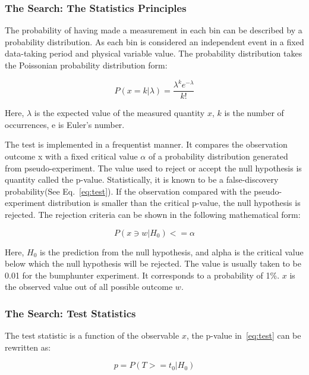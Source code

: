 \subsubsection{The Search: The Statistics Principles}
The probability of having made a measurement in each bin can be described by a probability distribution. As each bin is considered an independent event in a fixed data-taking period and physical variable value. The probability distribution takes the Poissonian probability distribution form:

\begin{equation}
 P(x=k|\lambda) = \frac{\lambda^{k}e^{-\lambda}}{k!} 
 \label{eq:Poissonian}
\end{equation}

Here, $\lambda$ is the expected value of the measured quantity $x$, $k$ is the number of occurrences, e is Euler's number.

The test is implemented in a frequentist manner. It compares the observation outcome x with a fixed critical value $\alpha$ of a probability distribution generated from pseudo-experiment. The value used to reject or accept the null hypothesis is quantity called the p-value. Statistically, it is known to be a false-discovery probability(See Eq.~\ref{eq:test}). If the observation compared with the pseudo-experiment distribution is smaller than the critical p-value, the null hypothesis is rejected. The rejection criteria can be shown in the following mathematical form:

\begin{equation}
    P(x \ni w|H_0)<= \alpha 
    \label{eq:test}
\end{equation}

Here, $H_0$ is the prediction from the null hypothesis, and alpha is the critical value below which the null hypothesis will be rejected. The value is usually taken to be 0.01 for the bumphunter experiment. It corresponds to a probability of 1\%. $x$ is the observed value out of all possible outcome $w$.  

\subsubsection{The Search: Test Statistics}
\label{teststatistics}

The test statistic is a function of the observable $x$, the p-value in~\ref{eq:test} can be rewritten as:
    
\begin{equation}
    p = P(T>=t_{0}| H_{0})
\label{eq:pvaluetestStats}
\end{equation}

